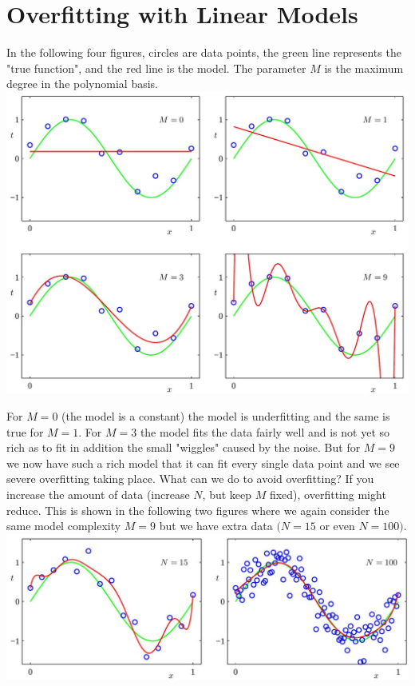 \documentclass[10pt]{article}
\begin{document}
\section*{Overfitting with Linear Models}
In the following four figures, circles are data points, the green line represents the "true function", and the red line is the model. The parameter $M$ is the maximum degree in the polynomial basis.
\includegraphics[max width=\textwidth, center]{2023_12_30_cfff7db3d8d5672f46efg-4}

For $M=0$ (the model is a constant) the model is underfitting and the same is true for $M=1$. For $M=3$ the model fits the data fairly well and is not yet so rich as to fit in addition the small "wiggles" caused by the noise. But for $M=9$ we now have such a rich model that it can fit every single data point and we see severe overfitting taking place. What can we do to avoid overfitting? If you increase the amount of data (increase $N$, but keep $M$ fixed), overfitting
might reduce. This is shown in the following two figures where we again consider the same model complexity $M=9$ but we have extra data $(N=15$ or even $N=100)$.
\includegraphics[max width=\textwidth, center]{2023_12_30_cfff7db3d8d5672f46efg-5}
\end{document}
